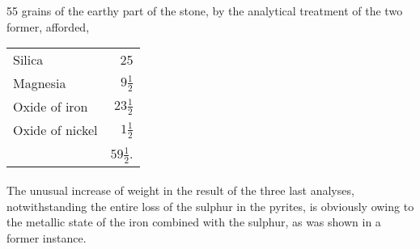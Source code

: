 \documentclass[a4paper, 12pt, oneside]{article}
\begin{document}
55 grains of the earthy part of the stone, by the analytical treatment of the two former, afforded,
\begin{table}[H]
    \centering
    \begin{tabular}{l r}
        Silica & 25 \\
        Magnesia & $9\frac{1}{2}$ \\
        Oxide of iron & $23\frac{1}{2}$ \\ 
        Oxide of nickel & $1\frac{1}{2}$ \\ \hline
        ~ & $59\frac{1}{2}$. \\
    \end{tabular}
\end{table}
\paragraph{}
The unusual increase of weight in the result of the three last analyses, notwithstanding the entire loss of the sulphur in the pyrites, is obviously owing to the metallic state of the iron combined with the sulphur, as was shown in a former instance.
\end{document}
